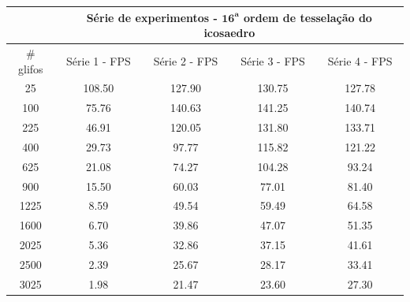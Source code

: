\documentclass[
    12pt,                %
    oneside,            %
    a4paper,            %
    english,            %
    french,                %
    spanish,            %
    brazil                %
    ]{abntex2}
\begin{document}
\begin{apendicesenv}
\begin{table}[htb]
\begin{tabular}{c|c|c|c|c|}
\cline{2-5}
\textbf{}                       & \multicolumn{4}{c|}{\textbf{Série de experimentos - $\mathbf{16^a}$ ordem de tesselação do icosaedro}} \\ \hline
\multicolumn{1}{|c|}{\# glifos} & Série 1 - FPS             & Série 2 - FPS             & Série 3 - FPS             & Série 4 - FPS            \\ \hline
\multicolumn{1}{|c|}{25}        & 108.50                    & 127.90                    & 130.75                    & 127.78                   \\ \hline
\multicolumn{1}{|c|}{100}       & 75.76                     & 140.63                    & 141.25                    & 140.74                   \\ \hline
\multicolumn{1}{|c|}{225}       & 46.91                     & 120.05                    & 131.80                    & 133.71                   \\ \hline
\multicolumn{1}{|c|}{400}       & 29.73                     & 97.77                     & 115.82                    & 121.22                   \\ \hline
\multicolumn{1}{|c|}{625}       & 21.08                     & 74.27                     & 104.28                    & 93.24                    \\ \hline
\multicolumn{1}{|c|}{900}       & 15.50                     & 60.03                     & 77.01                     & 81.40                    \\ \hline
\multicolumn{1}{|c|}{1225}      & 8.59                      & 49.54                     & 59.49                     & 64.58                    \\ \hline
\multicolumn{1}{|c|}{1600}      & 6.70                      & 39.86                     & 47.07                     & 51.35                    \\ \hline
\multicolumn{1}{|c|}{2025}      & 5.36                      & 32.86                     & 37.15                     & 41.61                    \\ \hline
\multicolumn{1}{|c|}{2500}      & 2.39                      & 25.67                     & 28.17                     & 33.41                    \\ \hline
\multicolumn{1}{|c|}{3025}      & 1.98                      & 21.47                     & 23.60                     & 27.30                    \\ \hline

\end{tabular}
\end{table}
\end{apendicesenv}
\end{document}
